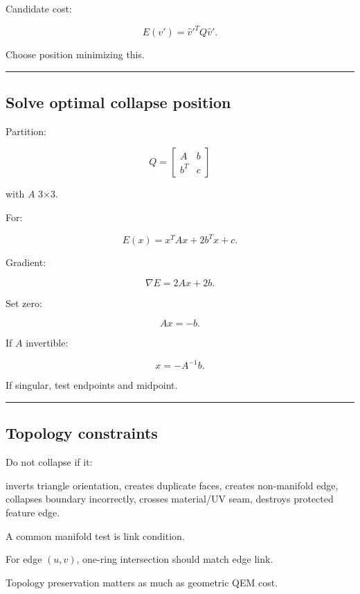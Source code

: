 Candidate cost:

\[
\boxed{
E(v')
=
\hat v'^TQ\hat v'.
}
\]

Choose position minimizing this.

\begin{center}\rule{0.5\linewidth}{0.5pt}\end{center}

\subsection{Solve optimal collapse position}\label{04-visual-computing-ii-ch041-solve-optimal-collapse-position}

Partition:

\[
Q=
\begin{bmatrix}
A&b\\
b^T&c
\end{bmatrix}
\]

with \(A\) 3×3.

For:

\[
E(x)=x^TAx+2b^Tx+c.
\]

Gradient:

\[
\nabla E=
2Ax+2b.
\]

Set zero:

\[
\boxed{
Ax=-b.
}
\]

If \(A\) invertible:

\[
x=-A^{-1}b.
\]

If singular, test endpoints and midpoint.

\begin{center}\rule{0.5\linewidth}{0.5pt}\end{center}

\subsection{Topology constraints}\label{04-visual-computing-ii-ch041-topology-constraints}

Do not collapse if it:

inverts triangle orientation, creates duplicate faces, creates non-manifold edge, collapses boundary incorrectly, crosses material/UV seam, destroys protected feature edge.

A common manifold test is link condition.

For edge \((u,v)\), one-ring intersection should match edge link.

Topology preservation matters as much as geometric QEM cost.

